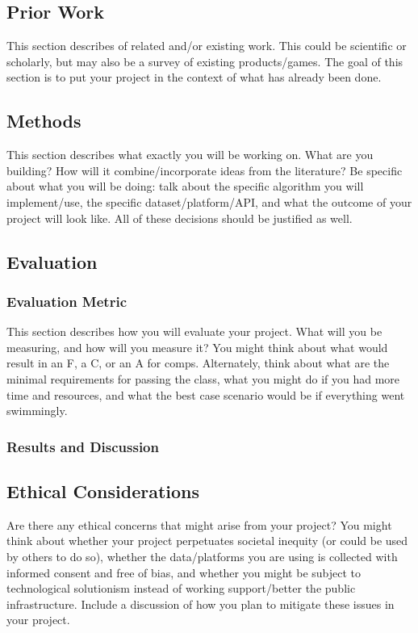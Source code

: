 \documentclass[10pt,twocolumn]{article}
\begin{document}
\subsection{Prior Work}

This section describes of related and/or existing work.
This could be scientific or scholarly, but may also be a survey of existing products/games.
The goal of this section is to put your project in the context of what has already been done.

\subsection{Methods}

This section describes what exactly you will be working on.
What are you building? How will it combine/incorporate ideas from the literature? Be specific about what you will be doing: talk about the specific algorithm you will implement/use, the specific dataset/platform/API, and what the outcome of your project will look like.
All of these decisions should be justified as well.

\subsection{Evaluation}

\subsubsection{Evaluation Metric}

This section describes how you will evaluate your project.
What will you be measuring, and how will you measure it?
You might think about what would result in an F, a C, or an A for comps.
Alternately, think about what are the minimal requirements for passing the class, what you might do if you had more time and resources, and what the best case scenario would be if everything went swimmingly.

\subsubsection{Results and Discussion}

\subsection{Ethical Considerations}

Are there any ethical concerns that might arise from your project?
You might think about whether your project perpetuates societal inequity (or could be used by others to do so), whether the data/platforms you are using is collected with informed consent and free of bias, and whether you might be subject to technological solutionism instead of working support/better the public infrastructure.
Include a discussion of how you plan to mitigate these issues in your project.
\end{document}
